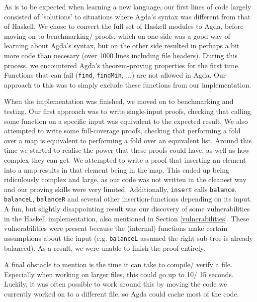\documentclass[a4paper,UKenglish,cleveref, autoref, thm-restate]{template/lipics-v2021}
\begin{document}
As is to be expected when learning a new language, our first lines of code largely consisted of 'solutions' to situations where Agda's syntax was different from that of Haskell. We chose to convert the full set of Haskell modules to Agda, before moving on to benchmarking/ proofs, which on one side was a good way of learning about Agda's syntax, but on the other side resulted in perhaps a bit more code than necesary (over 1000 lines including file headers). During this process, we encountered Agda's theorem-proving properties for the first time. Functions that can fail (\texttt{find}, \texttt{findMin}, ...) are not allowed in Agda. Our approach to this was to simply exclude these functions from our implementation.

When the implementation was finished, we moved on to benchmarking and testing. Our first approach was to write single-input proofs, checking that calling some function on a specific input was equivalent to the expected result. We also attempted to write some full-coverage proofs, checking that performing a fold over a map is equivalent to performing a fold over an equivalent list. Around this time we started to realise the power that these proofs could have, as well as how complex they can get. We attempted to write a proof that inserting an element into a map results in that element being in the map. This ended up being ridiculously complex and large, as our code was not written in the cleanest way and our proving skills were very limited. Additionally, \texttt{insert} calls \texttt{balance}, \texttt{balanceL}, \texttt{balanceR} and several other insertion-functions depending on its input. A fun, but slightly disappointing result was our discovery of some vulnerabilities in the Haskell implementation, also mentioned in Section \ref{vulnerabilities}. These vulnerabilities were present because the (internal) functions make certain assumptions about the input (e.g. \texttt{balanceL} assumed the right sub-tree is already balanced). As a result, we were unable to finish the proof entirely.

A final obstacle to mention is the time it can take to compile/ verify a file. Especially when working on larger files, this could go up to 10/ 15 seconds. Luckily, it was often possible to work around this by moving the code we currently worked on to a different file, so Agda could cache most of the code.
\end{document}
